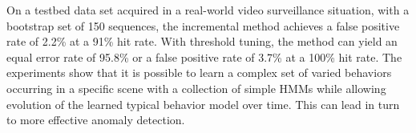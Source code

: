 On a testbed data set acquired in a real-world video
surveillance situation, with a bootstrap set of 150 sequences,
the incremental method achieves a false positive rate of 2.2\% at a
91\% hit rate.  With threshold tuning, the method can yield an equal
error rate of 95.8\% or a false positive rate of 3.7\% at a 100\% hit
rate. The experiments show that it is possible to learn a complex set
of varied behaviors occurring in a specific scene with a collection of
simple HMMs while allowing evolution of the learned typical behavior
model over time.  This can lead in turn to more effective anomaly
detection.

\FloatBarrier






